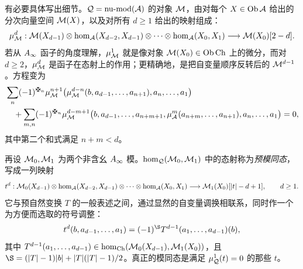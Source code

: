 \begin{definition*}
有必要具体写出细节。$\mathcal Q=\operatorname{nu\text{-}mod}(\mathcal A)$ 的对象 $\mathcal M$，由对每个 $X\in\operatorname{Ob}\mathcal A$ 给出的分次向量空间 $\mathcal M(X)$，以及对所有 $d\ge1$ 给出的映射组成：
\[
\mu^d_{\mathcal M}:\mathcal M(X_{d-1})\otimes\hom_{\mathcal A}(X_{d-2},X_{d-1})\otimes\cdots\otimes\hom_{\mathcal A}(X_0,X_1)
\longrightarrow\mathcal M(X_0)[2-d].
\]
若从 $A_\infty$ 函子的角度理解，$\mu^1_{\mathcal M}$ 就是像对象 $\mathcal M(X_0)\in\operatorname{Ob}\operatorname{Ch}$ 上的微分，而对 $d\ge2$，$\mu^d_{\mathcal M}$ 是函子在态射上的作用；更精确地，是把自变量顺序反转后的 $\mathcal M^{d-1}$。方程变为
\begin{equation}\label{eq:1.19}
\begin{aligned}
&\sum_n(-1)^{\sgnmark_n}\mu^{n+1}_{\M}\bigl(\mu^{d-n}_{\M}(b,a_{d-1},\ldots,a_{n+1}),a_n,\ldots,a_1\bigr)\\
&\quad+\sum_{m,n}(-1)^{\sgnmark_n}\mu^{d-m+1}_{\M}\bigl(b,a_{d-1},\ldots,a_{n+m+1},\mu^m_{\A}(a_{n+m},\ldots,a_{n+1}),a_n,\ldots,a_1\bigr)=0,
\end{aligned}
\end{equation}
其中第二个和式满足 $n+m<d$。
\end{definition*}

\begin{definition*}
再设 $\mathcal M_0,\mathcal M_1$ 为两个非含幺 $A_\infty$ 模。$\hom_{\mathcal Q}(\mathcal M_0,\mathcal M_1)$ 中的态射称为\emph{预模同态}，写成一列映射
\[
t^d:\mathcal M_0(X_{d-1})\otimes\hom_{\mathcal A}(X_{d-2},X_{d-1})\otimes\cdots\otimes\hom_{\mathcal A}(X_0,X_1)
\longrightarrow\mathcal M_1(X_0)[|t|-d+1],\qquad d\ge1.
\]
它与预自然变换 $T$ 的一般表述之间，通过显然的自变量调换相联系，同时作一个为方便而选取的符号调整：
\begin{equation}\label{eq:1.20}
t^d(b,a_{d-1},\ldots,a_1)=(-1)^{\S} T^{d-1}(a_1,\ldots,a_{d-1})(b),
\end{equation}
其中 $T^{d-1}(a_1,\ldots,a_{d-1})\in\hom_{\operatorname{Ch}}(\mathcal M_0(X_{d-1}),\mathcal M_1(X_0))$，且 $\S=(|T|-1)|b|+|T|(|T|-1)/2$。真正的模同态是满足 $\mu^1_{\mathcal Q}(t)=0$ 的那些 $t$。
\end{definition*}

